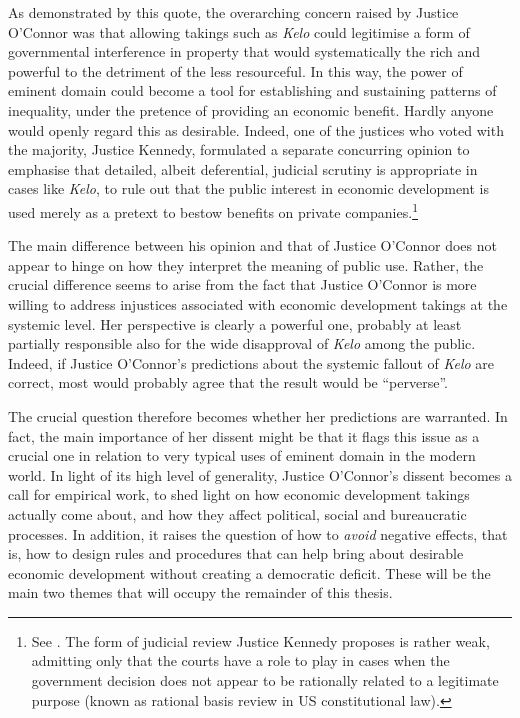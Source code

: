 As demonstrated by this quote, the overarching concern raised by Justice O'Connor was that allowing takings such as {\it Kelo} could legitimise a form of governmental interference in property that would systematically  the rich and powerful to the detriment of the less resourceful. In this way, the power of eminent domain could become a tool for establishing and sustaining patterns of inequality, under the pretence of providing an economic benefit. Hardly anyone would openly regard this as desirable. Indeed, one of the justices who voted with the majority, Justice Kennedy, formulated a separate concurring opinion to emphasise that detailed, albeit deferential, judicial scrutiny is appropriate in cases like {\it Kelo}, to rule out that the public interest in economic development is used merely as a pretext to bestow benefits on private companies.\footnote{See \cite[490-493]{kelo05}.  The form of judicial review Justice Kennedy proposes is rather weak, admitting only that the courts have a role to play in cases when the government decision does not appear to be rationally related to a legitimate purpose (known as rational basis review in US constitutional law).}

The main difference between his opinion and that of Justice O'Connor does not appear to hinge on how they interpret the meaning of public use. Rather, the crucial difference seems to arise from the fact that Justice O'Connor is more willing to address injustices associated with economic development takings at the systemic level. Her perspective is clearly a powerful one, probably at least partially responsible also for the wide disapproval of {\it Kelo} among the public. Indeed, if Justice O'Connor's predictions about the systemic fallout of {\it Kelo} are correct, most would probably agree that the result would be ``perverse''.

The crucial question therefore becomes whether her predictions are warranted. In fact, the main importance of her dissent might be that it flags this issue as a crucial one in relation to very typical uses of eminent domain in the modern world. In light of its high level of generality, Justice O'Connor's dissent becomes a call for empirical work, to shed light on how economic development takings actually come about, and how they affect political, social and bureaucratic processes. In addition, it raises the question of how to {\it avoid} negative effects, that is, how to design rules and procedures that can help bring about desirable economic development without creating a democratic deficit. These will be the main two themes that will occupy the remainder of this thesis.

